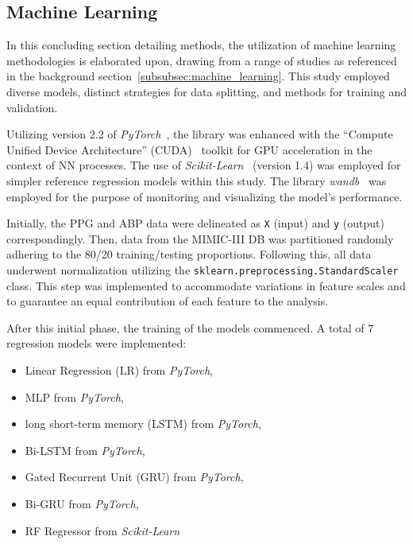 \subsection{Machine Learning}
\label{subsec:ml_methods}

In this concluding section detailing methods, the utilization of machine learning methodologies is elaborated upon,
drawing from a range of studies as referenced in the background section~\ref{subsubsec:machine_learning}.
This study employed diverse models, distinct strategies for data splitting, and methods for training and validation.

Utilizing version 2.2 of \textit{PyTorch}~\cite{PyTorch}, the library was enhanced with the \enquote{Compute Unified Device Architecture} (CUDA)~\cite{CUDAToolkitFree} toolkit for \ac{GPU} acceleration in the context of NN processes.
The use of \textit{Scikit-Learn}~\cite{ScikitlearnMachineLearning} (version 1.4) was employed for simpler reference regression models within this study.
The library \textit{wandb}~\cite{Wandb} was employed for the purpose of monitoring and visualizing the model's performance.

Initially, the PPG and ABP data were delineated as \texttt{X} (input) and \texttt{y} (output) correspondingly.
Then, data from the MIMIC-III DB was partitioned randomly adhering to the 80/20 training/testing proportions.
Following this, all data underwent normalization utilizing the \texttt{sklearn.preprocessing.StandardScaler} class.
This step was implemented to accommodate variations in feature scales and to guarantee an equal contribution of each feature to the analysis.

After this initial phase, the training of the models commenced.
A total of 7 regression models were implemented:
\vspace{-0.2cm}
\begin{itemize}
    \item Linear Regression (\ac{LR}) from \textit{PyTorch},
    \item \ac{MLP} from \textit{PyTorch},
    \item long short-term memory (\ac{LSTM}) from \textit{PyTorch},
    \item \ac{Bi-LSTM} from \textit{PyTorch},
    \item Gated Recurrent Unit (\ac{GRU}) from \textit{PyTorch},
    \item \ac{Bi-GRU} from \textit{PyTorch},
    \item \ac{RF} Regressor from \textit{Scikit-Learn}
\end{itemize}

